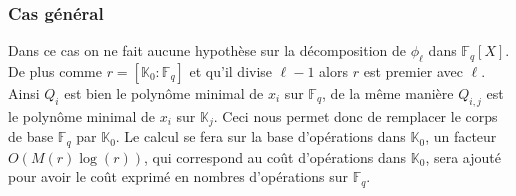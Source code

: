 \documentclass[10pt,a4paper]{book}
\theoremstyle{plain}
\theoremstyle{definition}
\theoremstyle{definition}
\theoremstyle{definition}
\newtheorem{prop}[thm]{Proposition}
\theoremstyle{definition}
\theoremstyle{remark}
\theoremstyle{remark}
\begin{document}
%

\subsubsection{Cas général}
Dans ce cas on ne fait aucune hypothèse sur la décomposition de $\phi_{\ell}$ dans $\mathbb{F}_q[X]$. De plus comme $r=[\mathbb{K}_0:\mathbb{F}_q]$ et qu'il divise $\ell-1$ alors $r$ est premier avec $\ell$. Ainsi $Q_i$ est bien le polynôme minimal de $x_i$ sur $\mathbb{F}_q$, de la même manière $Q_{i,j}$ est le polynôme minimal de $x_i$ sur $\mathbb{K}_j$. Ceci nous permet donc de remplacer le corps de base $\mathbb{F}_q$ par $\mathbb{K}_0$. Le calcul se fera sur la base d'opérations dans $\mathbb{K}_0$, un facteur $O(M(r)\log(r))$, qui correspond au coût d'opérations dans $\mathbb{K}_0$, sera ajouté pour avoir le coût exprimé en nombres d'opérations sur $\mathbb{F}_q$.
\end{document}
